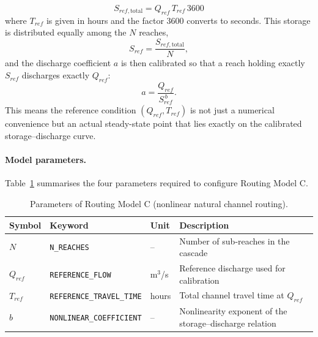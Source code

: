 \documentclass[a4paper, 12pt]{report}
\begin{document}
\begin{equation}
	S_{ref,\text{total}} = Q_{ref} \, T_{ref} \, 3600
	\label{eq:routingC-sreftotal}
\end{equation}
where $T_{ref}$ is given in hours and the factor $3600$ converts to seconds. This storage is
distributed equally among the $N$ reaches,
\begin{equation}
	S_{ref} = \frac{S_{ref,\text{total}}}{N},
	\label{eq:routingC-sref}
\end{equation}
and the discharge coefficient $a$ is then calibrated so that a reach holding exactly $S_{ref}$
discharges exactly $Q_{ref}$:
\begin{equation}
	a = \frac{Q_{ref}}{S_{ref}^{\,b}}.
	\label{eq:routingC-acal}
\end{equation}
This means the reference condition $(Q_{ref}, T_{ref})$ is not just a numerical convenience but an
actual steady-state point that lies exactly on the calibrated storage--discharge curve.

\paragraph{Model parameters.}
Table~\ref{tab:routingC-params} summarises the four parameters required to configure Routing
Model C.

\begin{table}[htbp]
	\centering
	\caption{Parameters of Routing Model C (nonlinear natural channel routing).}
	\label{tab:routingC-params}
	\begin{tabular}{@{}llll@{}}
		\toprule
		Symbol & Keyword & Unit & Description \\
		\midrule
		$N$      & \texttt{N\_REACHES}             & --      & Number of sub-reaches in the cascade \\
		$Q_{ref}$ & \texttt{REFERENCE\_FLOW}         & m$^3$/s & Reference discharge used for calibration \\
		$T_{ref}$ & \texttt{REFERENCE\_TRAVEL\_TIME} & hours   & Total channel travel time at $Q_{ref}$ \\
		$b$      & \texttt{NONLINEAR\_COEFFICIENT}  & --      & Nonlinearity exponent of the storage--discharge relation \\
		\bottomrule
	\end{tabular}
\end{table}
\end{document}
